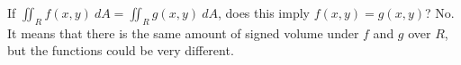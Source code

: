 {If $\iint_R f(x,y)\ dA = \iint_R g(x,y)\ dA$, does this imply $f(x,y) = g(x,y)$?
}
{No. It means that there is the same amount of signed volume under $f$ and $g$ over $R$, but the functions could be very different.
}
